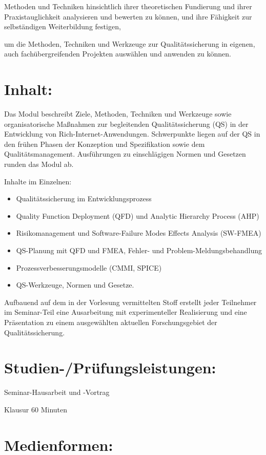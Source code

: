 Methoden und Techniken hinsichtlich ihrer theoretischen Fundierung und
ihrer Praxistauglichkeit analysieren und bewerten zu können, und ihre
Fähigkeit zur selbständigen Weiterbildung festigen,

um die Methoden, Techniken und Werkzeuge zur Qualitätssicherung in
eigenen, auch fachübergreifenden Projekten auswählen und anwenden zu
können.

\section*{Inhalt:}\label{inhalt-21}

Das Modul beschreibt Ziele, Methoden, Techniken und Werkzeuge sowie
organisatorische Maßnahmen zur begleitenden Qualitätssicherung (QS) in
der Entwicklung von Rich-Internet-Anwendungen. Schwerpunkte liegen auf
der QS in den frühen Phasen der Konzeption und Spezifikation sowie dem
Qualitätsmanagement. Ausführungen zu einschlägigen Normen und Gesetzen
runden das Modul ab.

Inhalte im Einzelnen:

\begin{itemize}
\item
  Qualitätssicherung im Entwicklungsprozess
\item
  Quality Function Deployment (QFD) und Analytic Hierarchy Process (AHP)
\item
  Risikomanagement und Software-Failure Modes Effects Analysis (SW-FMEA)
\item
  QS-Planung mit QFD und FMEA, Fehler- und Problem-Meldungsbehandlung
\item
  Prozessverbesserungsmodelle (CMMI, SPICE)
\item
  QS-Werkzeuge, Normen und Gesetze.
\end{itemize}

Aufbauend auf dem in der Vorlesung vermittelten Stoff erstellt jeder
Teilnehmer im Seminar-Teil eine Ausarbeitung mit experimenteller
Realisierung und eine Präsentation zu einem ausgewählten aktuellen
Forschungsgebiet der Qualitätssicherung.

\section*{Studien-/Prüfungsleistungen:}\label{studien-pruxfcfungsleistungen-21}

Seminar-Hausarbeit und -Vortrag

Klausur 60 Minuten

\section*{Medienformen:}\label{medienformen-21}

